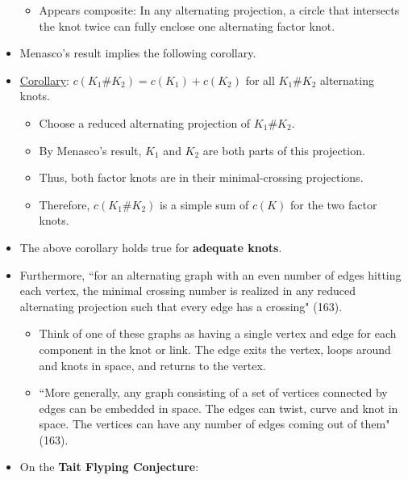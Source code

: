 \documentclass[titlepage]{article}
\numberwithin{figure}{section}
\numberwithin{table}{section}
\numberwithin{equation}{section}
\newcommand{\dq}[2]{``#1" (#2).}
\begin{document}
\begin{itemize}
    \begin{itemize}
        \item Appears composite: In any alternating projection, a circle that intersects the knot twice can fully enclose one alternating factor knot.
    \end{itemize}
    \item Menasco's result implies the following corollary.
    \item \underline{Corollary}: $c(K_1\#K_2)=c(K_1)+c(K_2)$ for all $K_1\#K_2$ alternating knots.
    \begin{itemize}
        \item Choose a reduced alternating projection of $K_1\#K_2$.
        \item By Menasco's result, $K_1$ and $K_2$ are both parts of this projection.
        \item Thus, both factor knots are in their minimal-crossing projections.
        \item Therefore, $c(K_1\#K_2)$ is a simple sum of $c(K)$ for the two factor knots.
    \end{itemize}
    \item The above corollary holds true for \textbf{adequate knots}.
    \item Furthermore, \dq{for an alternating graph with an even number of edges hitting each vertex, the minimal crossing number is realized in any reduced alternating projection such that every edge has a crossing}{163}
    \begin{itemize}
        \item Think of one of these graphs as having a single vertex and edge for each component in the knot or link. The edge exits the vertex, loops around and knots in space, and returns to the vertex.
        \item \dq{More generally, any graph consisting of a set of vertices connected by edges can be embedded in space. The edges can twist, curve and knot in space. The vertices can have any number of edges coming out of them}{163}
    \end{itemize}
    \item On the \textbf{Tait Flyping Conjecture}:
    \begin{figure}[h!]
        \centering
\end{figure}
\end{itemize}
\end{document}
